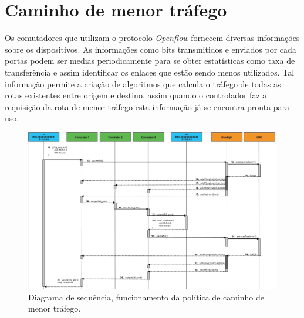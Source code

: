 \section{Caminho de menor tráfego}
\label{sec:bw}
Os comutadores que utilizam o protocolo \textit{Openflow} fornecem diversas informações sobre os dispositivos. As informações como bits transmitidos e enviados por cada portas podem ser medias periodicamente para se obter estatísticas como taxa de transferência e assim identificar os enlaces que estão sendo menos utilizados. Tal informação permite a criação de algoritmos que calcula o tráfego de todas as rotas existentes entre origem e destino, assim quando o controlador faz a requisição da rota de menor tráfego esta informação já se encontra pronta para uso.
\begin{figure}[!htb]
	\caption{\label{fig:bw_1}Diagrama de sequência, funcionamento da política de caminho de menor tráfego.}
	\begin{center}
	    \includegraphics[scale=0.445]{imagens/bw.1.jpg}
	\end{center}
\end{figure}

